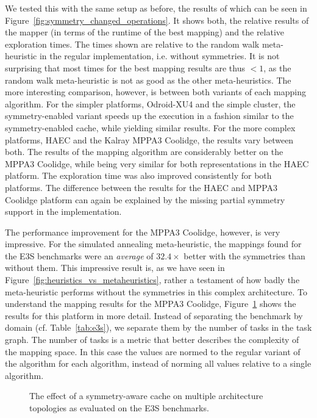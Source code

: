 We tested this with the same setup as before, the results of which can be seen in Figure~\ref{fig:symmetry_changed_operations}.
It shows both, the relative results of the mapper (in terms of the runtime of the best mapping) and the relative exploration times.
The times shown are relative to the random walk meta-heuristic in the regular implementation, i.e. without symmetries.
It is not surprising that most times for the best mapping results are thus $<1$, as the random walk meta-heuristic is not as good as the other meta-heuristics.
The more interesting comparison, however, is between both variants of each mapping algorithm.
For the simpler platforms, Odroid-XU4 and the simple cluster, the symmetry-enabled variant speeds up the execution in a fashion similar to the symmetry-enabled cache, while yielding similar results.
For the more complex platforms, \ac{HAEC} and the Kalray MPPA3 Coolidge, the results vary between both.
The results of the mapping algorithm are considerably better on the MPPA3 Coolidge, while being very similar for both representations in the \ac{HAEC} platform.
The exploration time was also improved consistently for both platforms.
The difference between the results for the \ac{HAEC} and MPPA3 Coolidge platform can again be explained by the missing partial symmetry support in the implementation.

The performance improvement for the MPPA3 Coolidge, however, is very impressive.
For the simulated annealing meta-heuristic, the mappings found for the \ac{E3S} benchmarks were an \emph{average} of $32.4 \times$ better with the symmetries than without them.
This impressive result is, as we have seen in Figure~\ref{fig:heuristics_vs_metaheuristics}, rather a testament of how badly the meta-heuristic performs without the symmetries in this complex architecture.
To understand the mapping results for the MPPA3 Coolidge, Figure~\ref{fig:symmetry_coolidge_changed_operations} shows the results for this platform in more detail.
Instead of separating the benchmark by domain (cf. Table~\ref{tab:e3s}), we separate them by the number of tasks in the task graph.
The number of tasks is a metric that better describes the complexity of the mapping space. 
In this case the values are normed to the regular variant of the algorithm for each algorithm, instead of norming all values relative to a single algorithm.

\begin{figure}[h]
	\centering
   \resizebox{0.95\textwidth}{!}{}
	\caption{The effect of a symmetry-aware cache on multiple architecture topologies as evaluated on the \ac{E3S} benchmarks.}
	\label{fig:symmetry_coolidge_changed_operations}
\end{figure}

